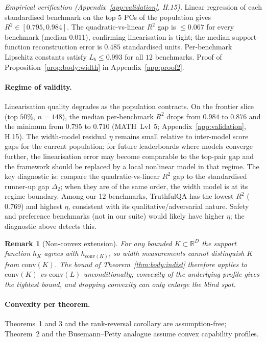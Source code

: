 \documentclass{article}
\newtheorem{remark}{Remark}
\begin{document}
\noindent \emph{Empirical verification (Appendix~\ref{app:validation},
H.15).} Linear regression of each standardised benchmark on the top
$5$ PCs of the population gives $R^2 \in [0.795, 0.984]$. The
quadratic-vs-linear $R^2$ gap is $\le 0.067$ for every benchmark
(median $0.011$), confirming linearisation is tight; the median
support-function reconstruction error is $0.485$ standardised units.
Per-benchmark Lipschitz constants satisfy $L_b \le 0.993$ for all
$12$ benchmarks. Proof of Proposition~\ref{prop:body:width} in
Appendix~\ref{app:proof2}.

\paragraph{Regime of validity.}
Linearisation quality degrades as the population contracts.
On the frontier slice (top $50\%$, $n = 148$), the median per-benchmark
$R^2$ drops from $0.984$ to $0.876$ and the minimum from $0.795$ to
$0.710$ (MATH~Lvl~5; Appendix~\ref{app:validation}, H.15). The
width-model residual $\eta$ remains small relative to inter-model
score gaps for the current population; for future leaderboards where
models converge further, the linearisation error may become
comparable to the top-pair gap and the framework should be replaced
by a local nonlinear model in that regime. The key diagnostic is:
compare the quadratic-vs-linear $R^2$ gap to the standardised
runner-up gap $\Delta_2$; when they are of the same order, the width
model is at its regime boundary. Among our $12$ benchmarks,
TruthfulQA has the lowest $R^2$ ($0.769$) and highest $\eta$,
consistent with its qualitative/adversarial nature. Safety and
preference benchmarks (not in our suite) would likely have higher
$\eta$; the diagnostic above detects this.

\begin{remark}[Non-convex extension]
For any bounded $K \subset \mathbb{R}^D$ the support function $h_K$
agrees with $h_{\mathrm{conv}(K)}$, so width measurements cannot
distinguish $K$ from $\mathrm{conv}(K)$. The bound of
Theorem~\ref{thm:body:indist} therefore applies to
$\mathrm{conv}(K)$ vs $\mathrm{conv}(L)$ unconditionally; convexity
of the underlying profile gives the tightest bound, and dropping
convexity can only enlarge the blind spot.
\end{remark}

\paragraph{Convexity per theorem.} Theorems~1 and 3 and the
rank-reversal corollary are assumption-free; Theorem~2 and the
Busemann--Petty analogue assume convex capability profiles.
\end{document}
